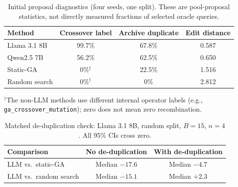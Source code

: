 \begin{table}[htbp]
\caption{Initial proposal diagnostics (four seeds, one split). These are pool-proposal statistics, not directly measured fractions of selected oracle queries.}
\label{tab:original-4}
\centering
\begin{tabularx}{\linewidth}{@{}Xccc@{}}
\toprule
Method & Crossover label & Archive duplicate & Edit distance \\
\midrule
Llama 3.1 8B & 99.7\% & 67.8\% & 0.587 \\
Qwen2.5 7B & 56.2\% & 62.5\% & 0.650 \\
Static-GA & 0\%$^\dagger$ & 22.5\% & 1.516 \\
Random search & 0\%$^\dagger$ & 0\% & 2.812 \\
\bottomrule
\end{tabularx}
\par\footnotesize $^\dagger$The non-LLM methods use different internal operator labels (e.g., \texttt{ga\_crossover\_mutation}); zero does not mean zero recombination.
\end{table}

\begin{table}[htbp]
\caption{Matched de-duplication check: Llama 3.1 8B, random split, $B=15$, $n=4$. All 95\% CIs cross zero.}
\label{tab:original-5}
\centering
\begin{tabular}{@{}lcc@{}}
\toprule
Comparison & No de-duplication & With de-duplication \\
\midrule
LLM vs.\ static-GA & Median $-17.6$ & Median $-4.7$ \\
LLM vs.\ random search & Median $-15.1$ & Median $+2.3$ \\
\bottomrule
\end{tabular}
\end{table}


